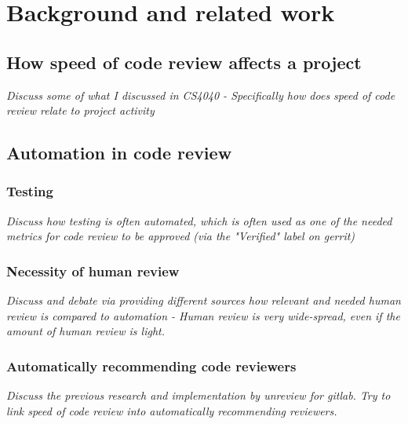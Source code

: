\chapter{Background and related work\label{chap:background-and-related-work}}

\section{How speed of code review affects a project}
\em{Discuss some of what I discussed in CS4040 - Specifically how does speed of code review relate to project activity}

\subsection{}

\section{Automation in code review}

\subsection{Testing}
\em{Discuss how testing is often automated, which is often used as one of the needed metrics for code review to be approved (via the "Verified" label on gerrit)}

\subsection{Necessity of human review}
\em{Discuss and debate via providing different sources how relevant and needed human review is compared to automation - Human review is very wide-spread, even if the amount of human review is light.}

\subsection{Automatically recommending code reviewers}
\em{Discuss the previous research and implementation by unreview for gitlab. Try to link speed of code review into automatically recommending reviewers.}